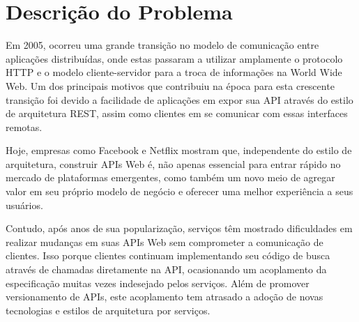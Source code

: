 \section[Descrição do Problema]{Descrição do Problema}

Em 2005, ocorreu uma grande transição no modelo de comunicação entre aplicações distribuídas, onde estas passaram a utilizar amplamente o protocolo HTTP e o modelo cliente-servidor para a troca de informações na World Wide Web. Um dos principais motivos que contribuiu na época para esta crescente transição foi devido a facilidade de aplicações em expor sua API através do estilo de arquitetura REST, assim como clientes em se comunicar com essas interfaces remotas. \cite{Duvander2013-2}

Hoje, empresas como Facebook e Netflix mostram que, independente do estilo de arquitetura, construir APIs Web é, não apenas essencial para entrar rápido no mercado de plataformas emergentes, como também um novo meio de agregar valor em seu próprio modelo de negócio e oferecer uma melhor experiência a seus usuários. \cite{Art2016}

Contudo, após anos de sua popularização, serviços têm mostrado dificuldades em realizar mudanças em suas APIs Web sem comprometer a comunicação de clientes. Isso porque clientes continuam implementando seu código de busca através de chamadas diretamente na API, ocasionando um acoplamento da especificação muitas vezes indesejado pelos serviços. Além de promover versionamento de APIs, este acoplamento tem atrasado a adoção de novas tecnologias e estilos de arquitetura por serviços.
